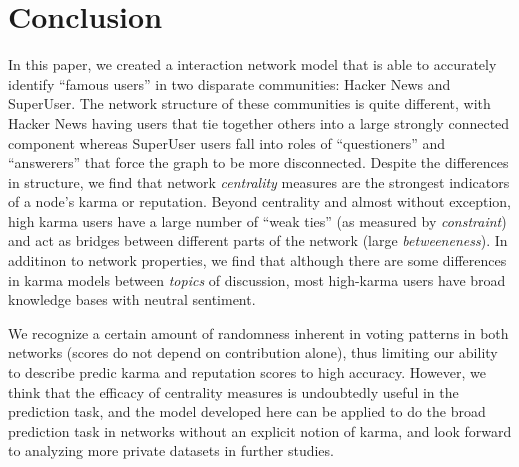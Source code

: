 \documentclass[11pt]{article}
\begin{document}
\section{Conclusion}

In this paper, we created a interaction network model that is able to accurately
identify ``famous users'' in two disparate communities: Hacker News and
SuperUser. The network structure of these communities is quite different, with
Hacker News having users that tie together others into a large strongly
connected component whereas SuperUser users fall into roles of ``questioners''
and ``answerers'' that force the graph to be more disconnected. Despite the
differences in structure, we find that network \textit{centrality} measures are
the strongest indicators of a node's karma or reputation. Beyond centrality and
almost without exception, high karma users have a large number of ``weak ties''
(as measured by \textit{constraint}) and act as bridges between different parts
of the network (large \textit{betweeneness}). In additinon to network
properties, we find that although there are some differences in karma models
between \textit{topics} of discussion, most high-karma users have broad
knowledge bases with neutral sentiment. 

We recognize a certain amount of randomness inherent in voting patterns in both
networks (scores do not depend on contribution alone), thus limiting our ability
to describe predic karma and reputation scores to high accuracy. However, we
think that the efficacy of centrality measures is undoubtedly useful in the
prediction task, and the model developed here can be applied to do the broad
prediction task in networks without an explicit notion of karma, and look
forward to analyzing more private datasets in further studies.

{} 
\end{document}
